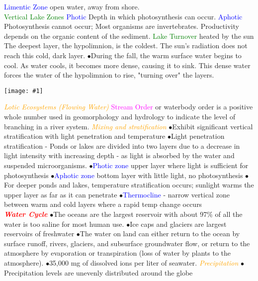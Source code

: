 \documentclass{article}
\newcommand{\ddd}{$\bullet$}
\newcommand{\red}[1]{\textcolor{red}{#1}}
\newcommand{\green}[1]{\textcolor{green}{#1}}
\newcommand{\blue}[1]{\textcolor{blue}{#1}}
\newcommand{\pink}[1]{\textcolor{magenta}{#1}}
\newcommand{\orange}[1]{\textcolor{orange}{#1}}
\newcommand{\mysection}[1]{\textbf{\textit{\red{#1}}}}
\newcommand{\mysubsection}[1]{{\textit{\orange{#1}}}}
\newcommand{\mysubsub}[1]{{{\green{#1}}}}
\newcommand{\mysubsubsub}[1]{{{\blue{#1}}}}
\newcommand{\vocab}[1]{{\pink{#1}}}
\newcommand{\fig}[1]{
	\texttt{[image: \#1]}
}
\newcommand{\figwidth}[2]{
	\texttt{[image: \#1]}
}
\begin{document}
\begin{multicols*}{4}
                \mysubsubsub{Limentic Zone} open water, away from shore.
            \\
            \mysubsub{Vertical Lake Zones}
                \mysubsubsub{Photic}
                    Depth in which photosynthesis can occur.
                \mysubsubsub{Aphotic}
                Photosynthesis cannot occur; Most organisms are invertebrates. Productivity depends on the organic content of the sediment.
          \mysubsub{Lake Turnover}
               heated by the sun The deepest layer, the hypolimnion, is the coldest. The sun's radiation does not reach this cold, dark layer. 
        	  \ddd During the fall, the warm surface water begins to cool. As water cools, it becomes more dense, causing it to sink. This dense water forces the water of the hypolimnion to rise, "turning over" the layers.
        	  \figwidth{turnover}{5}
        	  \mysubsection{Lotic Ecosystems (Flowing Water)}
        	  \vocab{Stream Order} or waterbody order is a positive whole number used in geomorphology and hydrology to indicate the level of branching in a river system. 
        \mysubsection{Mixing and stratification}
            \ddd Exhibit significant vertical stratification with light penetration and temperature 
            \ddd Light penetration stratification - Ponds or lakes are divided into two layers due to a decrease in light intensity with increasing depth - as light is absorbed by the water and suspended microorganisms.
            \ddd \blue{Photic zone} upper layer where light is sufficient for photosynthesis
            \ddd \blue{Aphotic zone} bottom layer with little light, no photosynthesis
            \ddd For deeper ponds and lakes, temperature stratification occurs; sunlight warms the upper layer as far as it can penetrate
            \ddd \blue{Thermocline} - narrow vertical zone between warm and cold layers where a rapid temp change occurs
    \\
	  \mysection{Water Cycle}
	    \ddd The oceans are the largest reservoir with about 97\% of all the water is too saline for most human use.
	    \ddd Ice caps and glaciers are largest reservoirs of freshwater
	    \ddd The water on land can either return to the ocean by surface runoff, rivers, glaciers, and subsurface groundwater flow, or return to the atmosphere by evaporation or transpiration (loss of water by plants to the atmosphere).
	    \ddd 35,000 mg of dissolved ions per liter of seawater.
	    \mysubsection{Precipitation}
	        \ddd Precipitation levels are unevenly distributed around the globe

\end{multicols*}
\end{document}
